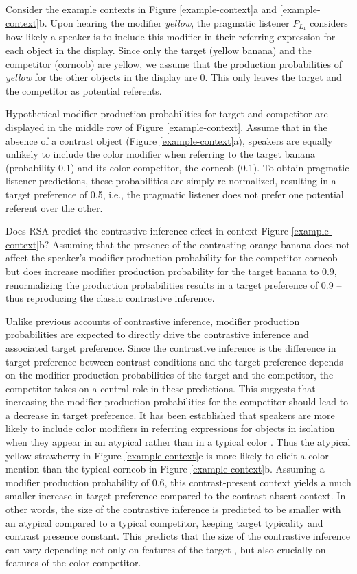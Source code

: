 \documentclass[10pt,letterpaper]{article}
\newcommand{\figref}[1]{Figure \ref{#1}}
\begin{document}
Consider the example contexts in \figref{example-context}a and \ref{example-context}b. Upon hearing the modifier \textit{yellow}, the pragmatic listener $P_{L_1}$ considers how likely a speaker is to include this modifier in their referring expression for each object in the display. Since only the target (yellow banana) and the competitor (corncob) are yellow, we assume that the production probabilities of \textit{yellow} for the other objects in the display are 0. This only leaves the target and the competitor as potential referents. 

Hypothetical modifier production probabilities for target and competitor are displayed in the middle row of \figref{example-context}. 
Assume that in the absence of a contrast object (\figref{example-context}a), speakers are equally unlikely to include the color modifier when referring to the target banana (probability 0.1) and its color competitor, the corncob (0.1). To obtain pragmatic listener predictions, these probabilities are simply re-normalized, resulting in a target preference of 0.5, i.e., the pragmatic listener does not  prefer one potential referent over the other.

Does RSA predict the contrastive inference effect in context \figref{example-context}b? Assuming that the presence of the contrasting orange banana does not affect the speaker's modifier production probability for the competitor corncob but does increase modifier production probability for the target banana to 0.9,  renormalizing the production probabilities results in a target preference of 0.9 -- thus reproducing the classic contrastive inference.

Unlike previous accounts of contrastive inference, modifier production probabilities are expected to directly drive the contrastive inference and associated target preference. Since the contrastive inference is the difference in target preference between contrast conditions and the target preference depends on the modifier production probabilities of the target and the competitor, the competitor takes on a central role in these predictions. This suggests that increasing the modifier production probabilities for the competitor should lead to a decrease in target preference. It has been established that speakers are more likely to include color modifiers in referring expressions for objects in isolation when they appear in an atypical rather than in a typical color \cite{Rubio-Fernandez:2016,Westerbeek:2015,Degen:inpress}. Thus the atypical yellow strawberry in \figref{example-context}c is more likely to elicit a color mention than the typical corncob in \figref{example-context}b. Assuming a modifier production probability of 0.6, this contrast-present context yields a much smaller increase in target preference compared to the contrast-absent context. In other words, the size of the contrastive inference is predicted to be smaller with an atypical compared to a typical competitor, keeping target typicality and contrast presence constant. This predicts that the size of the contrastive inference can vary depending not only on features of the target \cite<as previously shown by>{Sedivy:2003, Rubio-Fernandez:2019}, but also crucially on features of the color competitor. 
\end{document}
